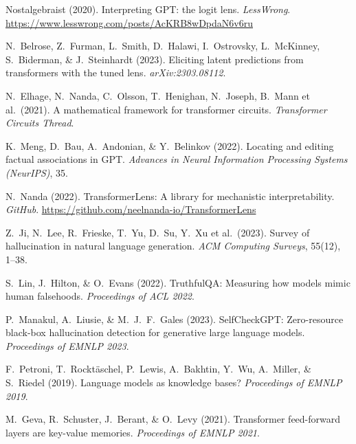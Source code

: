 \documentclass{article}
\begin{document}
{\small
\begin{enumerate}[leftmargin=2em,itemsep=2pt,label={[\arabic*]}]

\item Nostalgebraist (2020).
  Interpreting GPT: the logit lens.
  \textit{LessWrong}.
  \url{https://www.lesswrong.com/posts/AcKRB8wDpdaN6v6ru}

\item N.\ Belrose, Z.\ Furman, L.\ Smith, D.\ Halawi, I.\ Ostrovsky,
  L.\ McKinney, S.\ Biderman, \& J.\ Steinhardt (2023).
  Eliciting latent predictions from transformers with the tuned lens.
  \textit{arXiv:2303.08112}.

\item N.\ Elhage, N.\ Nanda, C.\ Olsson, T.\ Henighan, N.\ Joseph,
  B.\ Mann et al.\ (2021).
  A mathematical framework for transformer circuits.
  \textit{Transformer Circuits Thread}.

\item K.\ Meng, D.\ Bau, A.\ Andonian, \& Y.\ Belinkov (2022).
  Locating and editing factual associations in GPT.
  \textit{Advances in Neural Information Processing Systems (NeurIPS)}, 35.

\item N.\ Nanda (2022).
  TransformerLens: A library for mechanistic interpretability.
  \textit{GitHub}.
  \url{https://github.com/neelnanda-io/TransformerLens}

\item Z.\ Ji, N.\ Lee, R.\ Frieske, T.\ Yu, D.\ Su, Y.\ Xu et al.\ (2023).
  Survey of hallucination in natural language generation.
  \textit{ACM Computing Surveys}, 55(12), 1--38.

\item S.\ Lin, J.\ Hilton, \& O.\ Evans (2022).
  TruthfulQA: Measuring how models mimic human falsehoods.
  \textit{Proceedings of ACL 2022}.

\item P.\ Manakul, A.\ Liusie, \& M.\ J.\ F.\ Gales (2023).
  SelfCheckGPT: Zero-resource black-box hallucination detection for
  generative large language models.
  \textit{Proceedings of EMNLP 2023}.

\item F.\ Petroni, T.\ Rockt\"{a}schel, P.\ Lewis, A.\ Bakhtin,
  Y.\ Wu, A.\ Miller, \& S.\ Riedel (2019).
  Language models as knowledge bases?
  \textit{Proceedings of EMNLP 2019}.

\item M.\ Geva, R.\ Schuster, J.\ Berant, \& O.\ Levy (2021).
  Transformer feed-forward layers are key-value memories.
  \textit{Proceedings of EMNLP 2021}.


\end{enumerate}}
\end{document}
